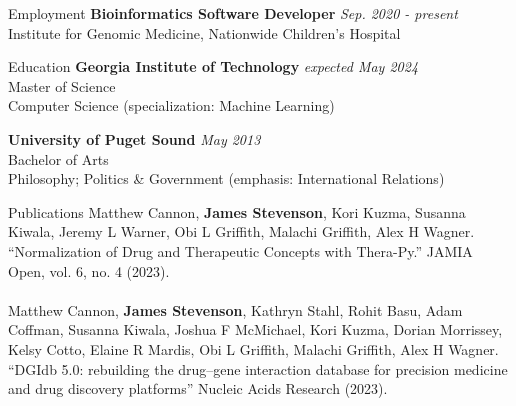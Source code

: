 \documentclass{cv} %
\begin{document}
\begin{rSection}{Employment}
{\bf Bioinformatics Software Developer} \hfill {\em Sep. 2020 - present}\\
Institute for Genomic Medicine, Nationwide Children's Hospital
\end{rSection}


\begin{rSection}{Education}
{\bf Georgia Institute of Technology} \hfill {\em expected May 2024}\\
Master of Science\\
Computer Science (specialization: Machine Learning)

{\bf University of Puget Sound} \hfill {\em May 2013}\\
Bachelor of Arts\\
Philosophy; Politics \& Government (emphasis: International Relations)
\end{rSection}


\begin{rSection}{Publications}
{Matthew Cannon, \textbf{James Stevenson}, Kori Kuzma, Susanna Kiwala, Jeremy L Warner, Obi L Griffith, Malachi Griffith, Alex H Wagner. ``Normalization of Drug and Therapeutic Concepts with Thera-Py.'' JAMIA Open, vol. 6, no. 4 (2023).}\\
\\
{Matthew Cannon, \textbf{James Stevenson}, Kathryn Stahl, Rohit Basu, Adam Coffman, Susanna Kiwala, Joshua F McMichael, Kori Kuzma, Dorian Morrissey, Kelsy Cotto, Elaine R Mardis, Obi L Griffith, Malachi Griffith, Alex H Wagner. ``DGIdb 5.0: rebuilding the drug–gene interaction database for precision medicine and drug discovery platforms'' Nucleic Acids Research (2023).}
\end{rSection}

\end{document}
